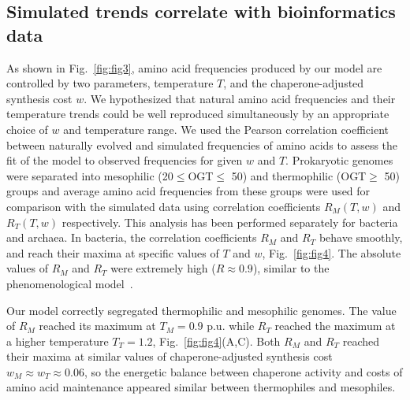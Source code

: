 \documentclass[10pt,letterpaper]{article}
\begin{document}
\subsection*{Simulated trends correlate with bioinformatics data}

As shown in Fig.~\ref{fig:fig3}, amino acid frequencies produced by our model are controlled by two parameters, temperature $T$, and the chaperone-adjusted synthesis cost $w$. We hypothesized that natural amino acid frequencies and their temperature trends could be well reproduced simultaneously by an appropriate choice of $w$ and temperature range. We used the Pearson correlation coefficient between naturally evolved and simulated frequencies of amino acids to assess the fit of the model to observed frequencies for given $w$ and $T$. Prokaryotic genomes were separated into mesophilic (20$\leq$OGT$\leq$ 50\textcelsius) and thermophilic (OGT$\geq$ 50\textcelsius) groups and average amino acid frequencies from these groups were used for comparison with the simulated data using correlation coefficients $R_M(T,w)$ and $R_T(T,w)$ respectively. This analysis has been performed separately for bacteria and archaea. In bacteria, the correlation coefficients $R_M$ and $R_T$ behave smoothly, and reach their maxima at specific values of $T$ and $w$, Fig.~\ref{fig:fig4}. The absolute values of $R_M$ and $R_T$ were extremely high ($R\approx0.9$), similar to the phenomenological model~\cite{Krick2014Amino}. 

Our model correctly segregated thermophilic and mesophilic genomes. The value of $R_M$ reached its maximum at $T_M=0.9$ p.u. while $R_T$ reached the maximum at a higher temperature $T_T=1.2$, Fig.~\ref{fig:fig4}(A,C). Both $R_M$ and $R_T$ reached their maxima at similar values of chaperone-adjusted synthesis cost $w_M\approx w_T \approx 0.06$, so the energetic balance between chaperone activity and costs of amino acid maintenance appeared similar between thermophiles and mesophiles.
\end{document}
